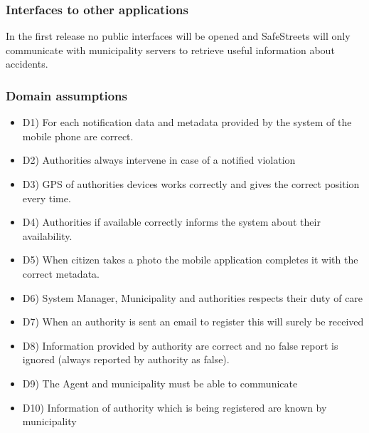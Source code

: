\subsubsection{ Interfaces to other applications}
In the first release no public interfaces will be opened and SafeStreets will only communicate with municipality servers to retrieve useful information about accidents.
\subsubsection{ Domain assumptions}
\begin{itemize}
\item D1) For each notification data and metadata provided by the system of the mobile phone are correct.
\item D2) Authorities always intervene in case of a notified violation
\item D3) GPS of authorities devices works correctly and gives the correct position every time. 
\item D4) Authorities if available correctly informs the system about their availability. 
\item D5) When citizen takes a photo the mobile application completes it with the correct metadata.
\item D6) System Manager, Municipality and authorities respects their duty of care
\item D7) When an authority is sent an email to register this will surely be received
\item D8) Information provided by authority are correct and no false report is ignored (always reported by authority as false).
\item D9) The Agent and municipality must be able to communicate 
\item D10) Information of authority which is being registered are known by municipality
\end{itemize}
